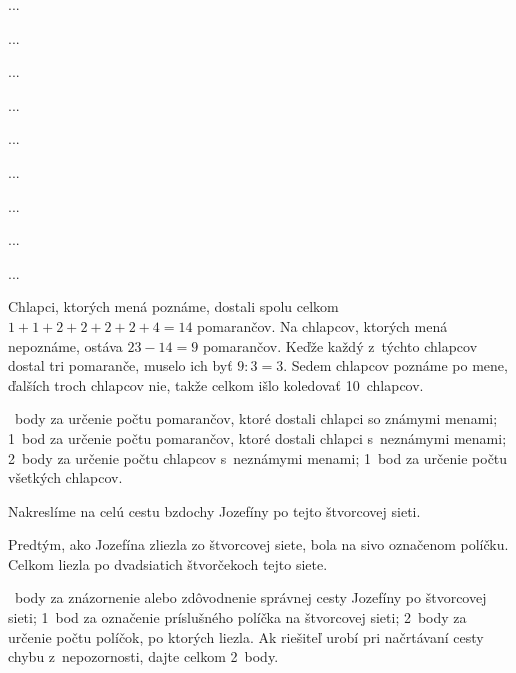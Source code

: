 {%
...}

{%
...}

{%
...}

{%
...}

{%
...}

{%
...}

{%
...}

{%
...}

{%
...}

{%
Chlapci, ktorých mená poznáme, dostali spolu celkom $1 + 1 + 2 + 2 + 2 + 2 + 4 =
14$ pomarančov. Na chlapcov, ktorých mená nepoznáme, ostáva $23 - 14 = 9$ pomarančov.
Keďže každý z~týchto chlapcov dostal tri pomaranče, muselo ich byť $9 : 3
= 3$.
Sedem chlapcov poznáme po mene, ďalších troch chlapcov nie, takže celkom išlo
koledovať 10~chlapcov.

~body za určenie počtu pomarančov, ktoré dostali chlapci so známymi menami;
1~bod za určenie počtu pomarančov, ktoré dostali chlapci s~neznámymi menami;
2~body za určenie počtu chlapcov s~neznámymi menami;
1~bod za určenie počtu všetkých chlapcov.
\endhodnotenie
}

{%
Nakreslíme na \obr{} celú cestu bzdochy Jozefíny po tejto štvorcovej sieti.
%

Predtým, ako Jozefína zliezla zo štvorcovej siete, bola na sivo označenom políčku.
Celkom liezla po dvadsiatich štvorčekoch tejto siete.

~body za znázornenie alebo zdôvodnenie správnej cesty Jozefíny po štvorcovej sieti;
1~bod za označenie príslušného políčka na štvorcovej sieti;
2~body za určenie počtu políčok, po ktorých liezla.
Ak riešiteľ urobí pri načrtávaní cesty chybu z~nepozornosti, dajte
celkom 2~body.
\endhodnotenie
}

